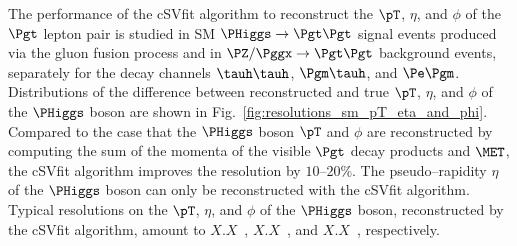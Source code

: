 The performance of the cSVfit algorithm to reconstruct the $\pT$,
$\eta$, and $\phi$ of the $\Pgt$ lepton pair is studied in SM $\PHiggs
\to \Pgt\Pgt$ signal events produced via the gluon fusion process
and in $\PZ/\Pggx \to \Pgt\Pgt$ background events,
separately for the decay channels $\tauh\tauh$, $\Pgm\tauh$, and $\Pe\Pgm$.
Distributions of the difference between reconstructed and true $\pT$,
$\eta$, and $\phi$ of the $\PHiggs$ boson are shown in
Fig.~\ref{fig:resolutions_sm_pT_eta_and_phi}.
Compared to the case that the $\PHiggs$ boson $\pT$ and $\phi$ are
reconstructed by computing the sum of the momenta of the visible $\Pgt$
decay products and $\MET$, the cSVfit algorithm improves the
resolution by $10$--$20\%$. The pseudo--rapidity $\eta$ of the
$\PHiggs$ boson can only be reconstructed with the cSVfit algorithm.
Typical resolutions on the $\pT$, $\eta$, and $\phi$ of the $\PHiggs$ boson,
reconstructed by the cSVfit algorithm, amount to $X.X$~\GeV, $X.X$~\mrad, and $X.X$~\mrad,
respectively.

%
%

